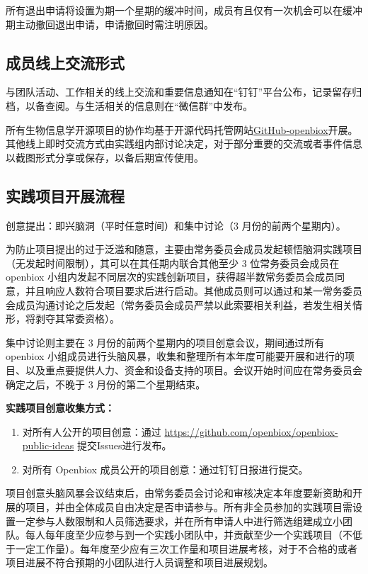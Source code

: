 \documentclass[]{article}
\providecommand{\tightlist}{%
  \setlength{\itemsep}{0pt}\setlength{\parskip}{0pt}}
\begin{document}
所有退出申请将设置为期一个星期的缓冲时间，成员有且仅有一次机会可以在缓冲期主动撤回退出申请，申请撤回时需注明原因。

\subsection{成员线上交流形式}

与团队活动、工作相关的线上交流和重要信息通知在``钉钉''平台公布，记录留存归档，以备查阅。与生活相关的信息则在``微信群''中发布。

所有生物信息学开源项目的协作均基于开源代码托管网站\href{https://github.com/openbiox}{GitHub-openbiox}开展。其他线上即时交流方式由实践组内部讨论决定，对于部分重要的交流或者事件信息以截图形式分享或保存，以备后期宣传使用。

\subsection{实践项目开展流程}

创意提出：即兴脑洞（平时任意时间）和集中讨论（3 月份的前两个星期内）。

为防止项目提出的过于泛滥和随意，主要由常务委员会成员发起顿悟脑洞实践项目（无发起时间限制），其可以在其任期内联合其他至少
3 位常务委员会成员在 openbiox
小组内发起不同层次的实践创新项目，获得超半数常务委员会成员同意，并且响应人数符合项目要求后进行启动。其他成员则可以通过和某一常务委员会成员沟通讨论之后发起（常务委员会成员严禁以此索要相关利益，若发生相关情形，将剥夺其常委资格）。

集中讨论则主要在 3 月份的前两个星期内的项目创意会议，期间通过所有
openbiox
小组成员进行头脑风暴，收集和整理所有本年度可能要开展和进行的项目、以及重点要提供人力、资金和设备支持的项目。会议开始时间应在常务委员会确定之后，不晚于
3 月份的第二个星期结束。

\textbf{实践项目创意收集方式：}

\begin{enumerate}
\def\labelenumi{\arabic{enumi}.}
\tightlist
\item
  对所有人公开的项目创意：通过
  \url{https://github.com/openbiox/openbiox-public-ideas}
  提交Issues进行发布。
\item
  对所有 Openbiox 成员公开的项目创意：通过钉钉日报进行提交。
\end{enumerate}

项目创意头脑风暴会议结束后，由常务委员会讨论和审核决定本年度要新资助和开展的项目，并由全体成员自由决定是否申请参与。所有非全员参加的实践项目需设置一定参与人数限制和人员筛选要求，并在所有申请人中进行筛选组建成立小团队。每人每年度至少应参与到一个实践小团队中，并贡献至少一个实践项目（不低于一定工作量）。每年度至少应有三次工作量和项目进展考核，对于不合格的或者项目进展不符合预期的小团队进行人员调整和项目进展规划。
\end{document}
